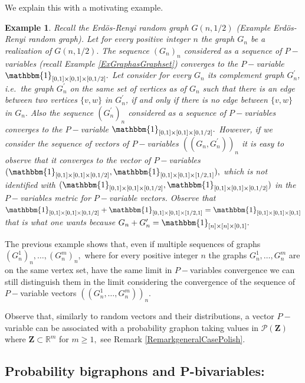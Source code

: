 \documentclass[11pt]{article}
\newtheorem{example}[theorem]{Example}
\def\R{\mathbb{R}}
\newcommand{\cP}{{\mathcal P}}  %
\newcommand{\Space}{\mathbf{Z}}
\begin{document}
We explain this with a motivating example.
\begin{example}
Recall the Erd\"os-Renyi random graph $G(n,1/2)$ (Example Erd\"os-Renyi random graph). Let for every positive integer $n$ the graph $G_n$ be a realization of $G(n,1/2).$ The sequence $(G_n)_n$ considered as a sequence of $P-$variables (recall Example \ref{ExGraphasGraphset}) converges to the $P-$variable $\mathbbm{1}_{[0,1]\times [0,1]\times [0,1/2] }.$ Let consider for every $G_n$ its complement graph $G_n^{\prime}$, i.e.\ the graph $G_n^{\prime}$ on the same set of vertices as of $G_n$ such that there is an edge between two vertices $\{v, w\}$ in $G_n^{\prime}$, if and only if there is no edge between $\{v, w\}$ in $G_n.$  Also the sequence $(G^{\prime}_n)_n$ considered as a sequence of $P-$variables converges to the $P-$variable $\mathbbm{1}_{[0,1]\times [0,1]\times [0,1/2] }.$ However, if we consider the sequence of vectors of $P-$variables $((G_n,G_n^{\prime}))_n$ it is easy to observe that it converges to the vector of $P-$variables \\$(\mathbbm{1}_{[0,1]\times [0,1]\times [0,1/2] },\mathbbm{1}_{[0,1]\times [0,1]\times [1/2,1] }),$ which is not identified with $(\mathbbm{1}_{[0,1]\times [0,1]\times [0,1/2] },\mathbbm{1}_{[0,1]\times [0,1]\times [0,1/2] })$ in the $P-$variables metric for $P-$variable vectors. Observe that $\mathbbm{1}_{[0,1]\times [0,1]\times [0,1/2] }+\mathbbm{1}_{[0,1]\times [0,1]\times [1/2,1] }=\mathbbm{1}_{[0,1]\times [0,1]\times [0,1] }$ that is what one wants because $G_n+G^{\prime}_n=\mathbbm{1}_{[n]\times [n]\times [0,1]}.$
\end{example}

The previous example shows that, even if multiple sequences of graphs $(G^1_n)_n,\ldots,(G^m_n)_n,$ where for every positive integer $n$ the graphs $G^1_n,\ldots,G^m_n$ are on the same vertex set, have the same limit in $P-$variables convergence we can still distinguish them in the limit considering the convergence of the sequence of $P-$variable vectors $((G^1_n,\ldots,G^m_n))_n.$  

Observe that, similarly to random vectors and their distributions, a vector $P-$variable can be associated with a probability graphon taking values in $\cP(\Space )$ where $\Space \subset \R^m$ for $m\geq 1,$ see Remark \ref{RemarkgeneralCasePolish}.

\subsection{Probability bigraphons and P-bivariables:}
\end{document}
